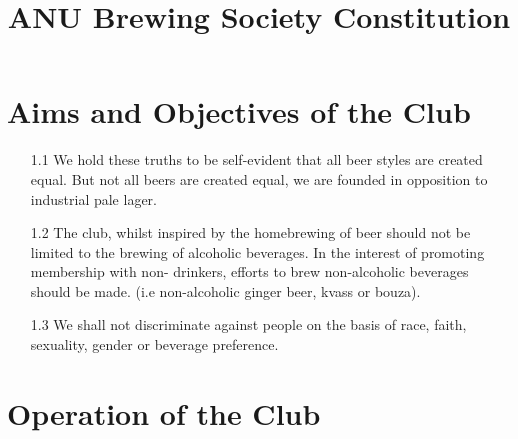 \documentclass{article}
\title{ANU Brewing Society Constitution}
\date{}
\begin{document}
\maketitle

\section{Aims and Objectives of the Club}

\begin{enumerate}
    \item[1.1] We hold these truths to be self-evident that all beer styles are created equal. But not all beers are created equal, we are founded in opposition to industrial pale lager.
    \item[1.2] The club, whilst inspired by the homebrewing of beer should not be limited to the brewing of alcoholic beverages. In the interest of promoting membership with non- drinkers, efforts to brew non-alcoholic beverages should be made. (i.e non-alcoholic ginger beer, kvass or bouza).
    \item[1.3] We shall not discriminate against people on the basis of race, faith, sexuality, gender or beverage preference.
\end{enumerate}

\section{Operation of the Club}
\end{document}
